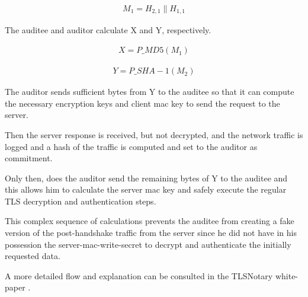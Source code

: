 \begin{ceqn}
    \begin{align}
        M_{1} = H_{2,1} \parallel H_{1,1}
    \end{align}
\end{ceqn}

The auditee and auditor calculate X and Y, respectively.

\begin{ceqn}
    \begin{align}
        X = P\_MD5(M_{1})
    \end{align}
\end{ceqn}

\begin{ceqn}
    \begin{align}
        Y = P\_SHA-1(M_{2})
    \end{align}
\end{ceqn}

The auditor sends sufficient bytes from Y to the auditee so that it can compute the necessary encryption keys and client mac key to send the request to the server.

Then the server response is received, but not decrypted, and the network traffic is logged and a hash of the traffic is computed and set to the auditor as commitment.

Only then, does the auditor send the remaining bytes of Y to the auditee and this allows him to calculate the server mac key and safely execute the regular TLS decryption and authentication steps.

This complex sequence of calculations prevents the auditee from creating a fake version of the post-handshake traffic from the server since he did not have in his possession the server-mac-write-secret to decrypt and authenticate the initially requested data.

A more detailed flow and explanation can be consulted in the TLSNotary white-paper \cite{TLSNotary}.



